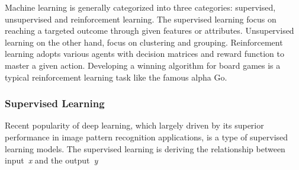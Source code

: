 Machine learning is generally categorized into three categories: supervised, unsupervised and reinforcement learning. The supervised learning focus on reaching a targeted outcome through given features or attributes. Unsupervised learning on the other hand, focus on clustering and grouping. Reinforcement learning adopts various agents with decision matrices and reward function to master a given action. Developing a winning algorithm for board games is a typical reinforcement learning task like the famous alpha Go.
\par

\subsubsection{Supervised Learning}

Recent popularity of deep learning, which largely driven by its superior performance in image pattern recognition applications, is a type of supervised learning models. The supervised learning is  deriving the relationship between input~\textit{x} and the output~\textit{y}
